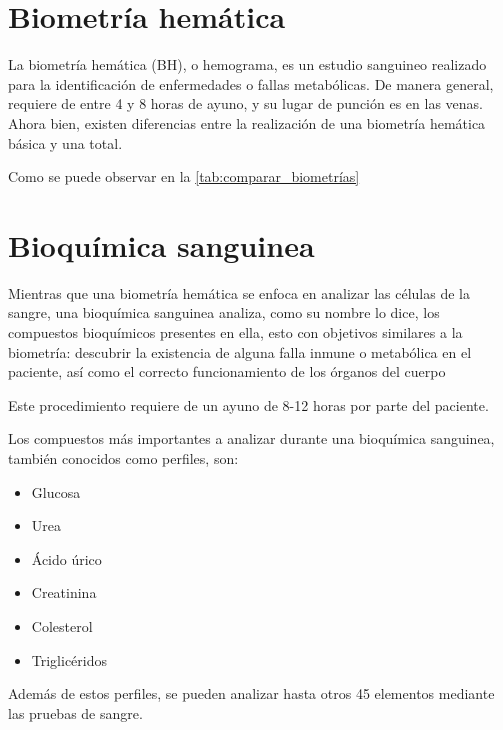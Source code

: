 \section{Biometría hemática}

La biometría hemática (BH), o hemograma, es un estudio sanguineo realizado para la identificación de enfermedades o fallas metabólicas. De manera general, requiere de entre 4 y 8 horas de ayuno, y su lugar de punción es en las venas. Ahora bien, existen diferencias entre la realización de una biometría hemática básica y una total.

     

Como se puede observar en la \autoref{tab:comparar_biometrías}

\section{Bioquímica sanguinea}

Mientras que una biometría hemática se enfoca en analizar las células de la sangre, una bioquímica sanguinea analiza, como su nombre lo dice, los compuestos bioquímicos presentes en ella, esto con objetivos similares a la biometría: descubrir la existencia de alguna falla inmune o metabólica en el paciente, así como el correcto funcionamiento de los órganos del cuerpo

Este procedimiento requiere de un ayuno de 8-12 horas por parte del paciente.

Los compuestos más importantes a analizar durante una bioquímica sanguinea, también conocidos como perfiles, son:

\begin{itemize}
    \item Glucosa
    \item Urea
    \item Ácido úrico
    \item Creatinina
    \item Colesterol
    \item Triglicéridos
\end{itemize}

Además de estos perfiles, se pueden analizar hasta otros 45 elementos mediante las pruebas de sangre.